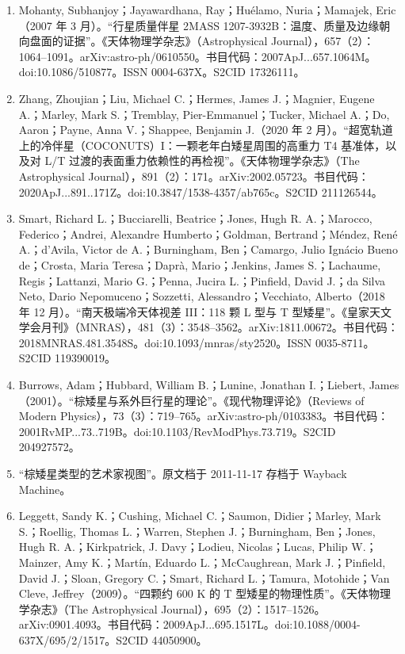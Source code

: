 \begin{enumerate}
\item Mohanty, Subhanjoy；Jayawardhana, Ray；Huélamo, Nuria；Mamajek, Eric（2007 年 3 月）。“行星质量伴星 2MASS 1207-3932B：温度、质量及边缘朝向盘面的证据”。《天体物理学杂志》（Astrophysical Journal），657（2）：1064–1091。arXiv:astro-ph/0610550。书目代码：2007ApJ...657.1064M。doi:10.1086/510877。ISSN 0004-637X。S2CID 17326111。
\item Zhang, Zhoujian；Liu, Michael C.；Hermes, James J.；Magnier, Eugene A.；Marley, Mark S.；Tremblay, Pier-Emmanuel；Tucker, Michael A.；Do, Aaron；Payne, Anna V.；Shappee, Benjamin J.（2020 年 2 月）。“超宽轨道上的冷伴星（COCONUTS）I：一颗老年白矮星周围的高重力 T4 基准体，以及对 L/T 过渡的表面重力依赖性的再检视”。《天体物理学杂志》（The Astrophysical Journal），891（2）：171。arXiv:2002.05723。书目代码：2020ApJ...891..171Z。doi:10.3847/1538-4357/ab765c。S2CID 211126544。
\item Smart, Richard L.；Bucciarelli, Beatrice；Jones, Hugh R. A.；Marocco, Federico；Andrei, Alexandre Humberto；Goldman, Bertrand；Méndez, René A.；d’Avila, Victor de A.；Burningham, Ben；Camargo, Julio Ignácio Bueno de；Crosta, Maria Teresa；Daprà, Mario；Jenkins, James S.；Lachaume, Regis；Lattanzi, Mario G.；Penna, Jucira L.；Pinfield, David J.；da Silva Neto, Dario Nepomuceno；Sozzetti, Alessandro；Vecchiato, Alberto（2018 年 12 月）。“南天极端冷天体视差 III：118 颗 L 型与 T 型矮星”。《皇家天文学会月刊》（MNRAS），481（3）：3548–3562。arXiv:1811.00672。书目代码：2018MNRAS.481.3548S。doi:10.1093/mnras/sty2520。ISSN 0035-8711。S2CID 119390019。
\item Burrows, Adam；Hubbard, William B.；Lunine, Jonathan I.；Liebert, James（2001）。“棕矮星与系外巨行星的理论”。《现代物理评论》（Reviews of Modern Physics），73（3）：719–765。arXiv:astro-ph/0103383。书目代码：2001RvMP...73..719B。doi:10.1103/RevModPhys.73.719。S2CID 204927572。
\item “棕矮星类型的艺术家视图”。原文档于 2011-11-17 存档于 Wayback Machine。
\item Leggett, Sandy K.；Cushing, Michael C.；Saumon, Didier；Marley, Mark S.；Roellig, Thomas L.；Warren, Stephen J.；Burningham, Ben；Jones, Hugh R. A.；Kirkpatrick, J. Davy；Lodieu, Nicolas；Lucas, Philip W.；Mainzer, Amy K.；Martín, Eduardo L.；McCaughrean, Mark J.；Pinfield, David J.；Sloan, Gregory C.；Smart, Richard L.；Tamura, Motohide；Van Cleve, Jeffrey（2009）。“四颗约 600 K 的 T 型矮星的物理性质”。《天体物理学杂志》（The Astrophysical Journal），695（2）：1517–1526。arXiv:0901.4093。书目代码：2009ApJ...695.1517L。doi:10.1088/0004-637X/695/2/1517。S2CID 44050900。

\end{enumerate}
